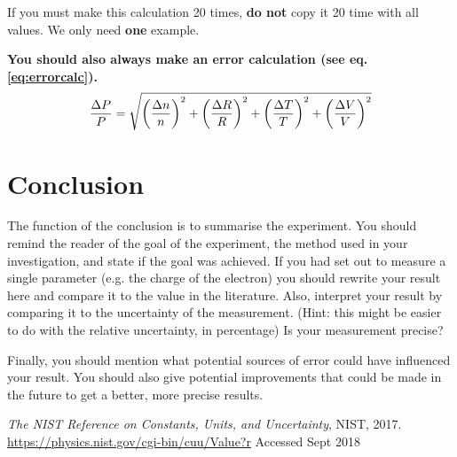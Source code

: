 \documentclass[11pt, a4paper]{article}
\begin{document}
If you must make this calculation 20 times, \textbf{do not} copy it 20 time with all values.
We only need \textbf{one} example.

\textbf{You should also always make an error calculation (see eq. \ref{eq:errorcalc}).}
\begin{equation}\label{eq:errorcalc}
\frac{\Delta P}{P}= \sqrt{\qty(\frac{\Delta n}{n})^2+\qty(\frac{\Delta R}{R})^2 + \qty(\frac{\Delta T}{T})^2 + \qty(\frac{\Delta V}{V})^2}
\end{equation}


\section*{Conclusion}

The function of the conclusion is to summarise the experiment. You should remind the reader of the goal of the experiment, the method used in your investigation, and state if the goal was achieved. If you had set out to measure a single parameter (e.g. the charge of the electron) you should rewrite your result here and compare it to the value in the literature. Also, interpret your result by comparing it to the uncertainty of the measurement. (Hint: this might be easier to do with the relative uncertainty, in percentage) Is your measurement precise?

Finally, you should mention what potential sources of error could have influenced your result. You should also give potential improvements that could be made in the future to get a better, more precise results.


\begin{thebibliography}{9}%

  \emph{The NIST Reference on Constants, Units, and Uncertainty},
  NIST,
  2017. \\
  \url{https://physics.nist.gov/cgi-bin/cuu/Value?r}
  Accessed Sept 2018
\end{thebibliography}
\end{document}
